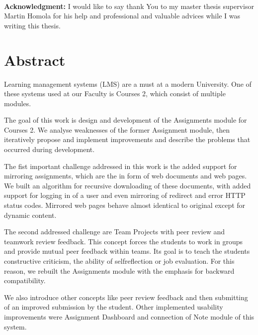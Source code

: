 \documentclass[12pt, oneside]{book}
\begin{document}
\frontmatter

\setcounter{page}{3}
\newpage 

\begin{minipage}{0.25\textwidth}~\end{minipage}
\begin{minipage}{0.68\textwidth}
{\bf Acknowledgment:} I would like to say thank You to my master thesis supervisor Martin Homola for his help and professional and valuable advices while I was writing this thesis.\bigskip\bigskip

\end{minipage}
\newpage


\newpage 
\chapter*{Abstract}

Learning management systems (LMS) are a must at a modern University. One of these systems used at our Faculty is Courses 2, which consist of multiple modules.

The goal of this work is design and development of the Assignments module for Courses 2. We analyse weaknesses of the former Assignment module, then iteratively propose and implement improvements and describe the problems that occurred during development.

The fist important challenge addressed in this work is the added support for mirroring assignments, which are the in form of web documents and web pages. We built an algorithm for recursive downloading of these documents, with added support for logging in of a user and even mirroring of redirect and error HTTP status codes. Mirrored web pages behave almost identical to original except for dynamic content.

The second addressed challenge are Team Projects with peer review and teamwork review feedback. This concept forces the students to work in groups and provide mutual peer feedback within teams. Its goal is to teach the students constructive criticism, the ability of self\-reflection or job evaluation. For this reason, we rebuilt the Assignments module with the emphasis for backward compatibility.

We also introduce other concepts like peer review feedback and then submitting of an improved submission by the student. Other implemented usability improvements were Assignment Dashboard and connection of Note module of this system.
\end{document}
